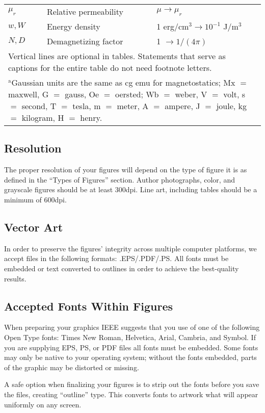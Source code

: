 \begin{table}
\begin{tabular}{|p{25pt}|p{75pt}|p{110pt}|}
$\mu_{r}$& 
Relative permeability& 
$\mu \to \mu_{r}$ \\
$w, W$& 
Energy density& 
1 erg/cm$^{3} \to  10^{-1}$ J/m$^{3}$ \\
$N, D$& 
Demagnetizing factor& 
1 $\to  1/(4\pi )$ \\
\hline
\multicolumn{3}{p{251pt}}{Vertical lines are optional in tables. Statements that serve as captions for 
the entire table do not need footnote letters. }\\
\multicolumn{3}{p{251pt}}{$^{\mathrm{a}}$Gaussian units are the same as cg emu for magnetostatics; Mx 
$=$ maxwell, G $=$ gauss, Oe $=$ oersted; Wb $=$ weber, V $=$ volt, s $=$ 
second, T $=$ tesla, m $=$ meter, A $=$ ampere, J $=$ joule, kg $=$ 
kilogram, H $=$ henry.}
\end{tabular}
\label{tab1}
\end{table}


\subsection{Resolution }
The proper resolution of your figures will depend on the type of figure it 
is as defined in the ``Types of Figures'' section. Author photographs, 
color, and grayscale figures should be at least 300dpi. Line art, including 
tables should be a minimum of 600dpi.

\subsection{Vector Art}
In order to preserve the figures' integrity across multiple computer 
platforms, we accept files in the following formats: .EPS/.PDF/.PS. All 
fonts must be embedded or text converted to outlines in order to achieve the 
best-quality results.


\subsection{Accepted Fonts Within Figures}
When preparing your graphics IEEE suggests that you use of one of the 
following Open Type fonts: Times New Roman, Helvetica, Arial, Cambria, and 
Symbol. If you are supplying EPS, PS, or PDF files all fonts must be 
embedded. Some fonts may only be native to your operating system; without 
the fonts embedded, parts of the graphic may be distorted or missing.

A safe option when finalizing your figures is to strip out the fonts before 
you save the files, creating ``outline'' type. This converts fonts to 
artwork what will appear uniformly on any screen.

